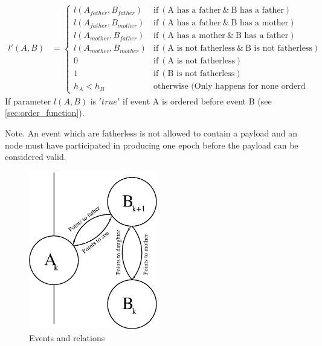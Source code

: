 \begin{align}
{l'}(A,B) & = 
\begin{cases}
{l}(A_{father},B_{father}) &  	
\text{if}  ~ (\text{A has a father} ~ \&  ~ \text{B has a father}) \\ 
{l}(A_{father},B_{mother}) &  	
\text{if}  ~ (\text{A has a father} ~ \&  ~ \text{B has a mother}) \\ 
{l}(A_{mother},B_{father}) &  	
\text{if}  ~ (\text{A has a mother} ~ \&  ~ \text{B has a father}) \\ 
{l}(A_{mother},B_{mother}) &  	
\text{if}  ~ (\text{A is not fatherless} ~ \&  ~ \text{B is not fatherless}) \\ 
0 &  	
\text{if}  ~ (\text{A is not fatherless}) \\ 
1 &  	
\text{if}  ~ (\text{B is not fatherless}) \\ 
{h}_{A} < {h}_{B} & 
\text{otherwise (Only happens for none orderd event)}
\end{cases} 
\label{equ:nested_order}    
\end{align}
If parameter $l(A,B)$ is $'true'$ if event A is ordered before event B (see \cref{sec:order_function}).

Note. An event which are fatherless is not allowed to contain a payload and an node must have participated in producing one epoch before the payload can be considered valid. 

\begin{figure}[H]
 \centering
 \includegraphics[width=0.5\textwidth]{fig/consensus_order.eps}
 \caption{Events and relations}
 \label{fig:consensus_order}
\end{figure}
